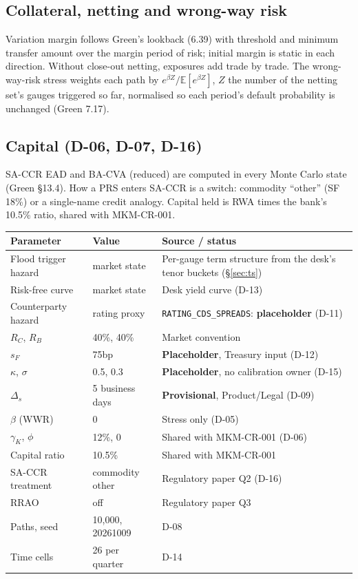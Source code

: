 \documentclass[11pt,a4paper]{article}
\begin{document}
\subsection{Collateral, netting and wrong-way risk}
Variation margin follows Green's lookback (6.39) with threshold and minimum
transfer amount over the margin period of risk; initial margin is static in
each direction. Without close-out netting, exposures add trade by trade. The
wrong-way-risk stress weights each path by $e^{\beta Z}/\mathbb{E}[e^{\beta Z}]$,
$Z$ the number of the netting set's gauges triggered so far, normalised so
each period's default probability is unchanged (Green 7.17).

\subsection{Capital (D-06, D-07, D-16)}
SA-CCR EAD and BA-CVA (reduced) are computed in every Monte Carlo state
(Green \S13.4). How a PRS enters SA-CCR is a switch: commodity ``other''
(SF 18\%) or a single-name credit analogy. Capital held is RWA times the
bank's 10.5\% ratio, shared with MKM-CR-001.

\mkminputs

\begin{longtable}{p{4.2cm}p{2.6cm}p{7.2cm}}
\toprule
\textbf{Parameter} & \textbf{Value} & \textbf{Source / status} \\
\midrule
Flood trigger hazard & market state & Per-gauge term structure from the desk's tenor buckets (\S\ref{sec:ts}) \\
Risk-free curve & market state & Desk yield curve (D-13) \\
Counterparty hazard & rating proxy & \texttt{RATING\_CDS\_SPREADS}: \textbf{placeholder} (D-11) \\
$R_C$, $R_B$ & 40\%, 40\% & Market convention \\
$s_F$ & 75bp & \textbf{Placeholder}, Treasury input (D-12) \\
$\kappa$, $\sigma$ & 0.5, 0.3 & \textbf{Placeholder}, no calibration owner (D-15) \\
$\Delta_s$ & 5 business days & \textbf{Provisional}, Product/Legal (D-09) \\
$\beta$ (WWR) & 0 & Stress only (D-05) \\
$\gamma_K$, $\phi$ & 12\%, 0 & Shared with MKM-CR-001 (D-06) \\
Capital ratio & 10.5\% & Shared with MKM-CR-001 \\
SA-CCR treatment & commodity other & Regulatory paper Q2 (D-16) \\
RRAO & off & Regulatory paper Q3 \\
Paths, seed & 10{,}000, 20261009 & D-08 \\
Time cells & 26 per quarter & D-14 \\
\bottomrule
\end{longtable}
\end{document}

